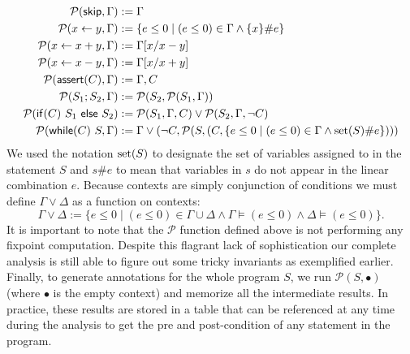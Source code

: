 \documentclass[nocopyrightspace,preprint]{sigplanconf}
\begin{document}
\begin{align*}
\mathcal P(\mathsf{skip}, \Gamma) &:= \Gamma \\
\mathcal P(x \gets y, \Gamma) &:= \{ e \le 0 \mid (e \le 0) \in \Gamma \land \{x\} \# e \} \\
\mathcal P(x \gets x + y, \Gamma) &:= \Gamma[x / x - y] \\
\mathcal P(x \gets x - y, \Gamma) &:= \Gamma[x / x + y] \\
\mathcal P(\mathsf{assert}(C), \Gamma) &:= \Gamma,C \\
\mathcal P(S_1; S_2, \Gamma) &:= \mathcal P(S_2, \mathcal P(S_1, \Gamma)) \\
\mathcal P(\mathsf{if} (C)~S_1~\mathsf{else}~S_2) &:=
  \mathcal P(S_1, \Gamma,C) \lor \mathcal P(S_2, \Gamma,\neg C) \\
\mathcal P(\mathsf{while}(C)~S, \Gamma) &:=
  \Gamma \lor (\neg C, \mathcal P(S, (C, \{ e \le 0 \mid (e \le 0) \in \Gamma \land {\rm set}(S) \# e \})))
\end{align*}
We used the notation ${\rm set}(S)$ to designate the set of variables
assigned to in the statement $S$ and $s\#e$ to mean that variables
in $s$ do not appear in the linear combination $e$.  Because contexts
are simply conjunction of conditions we must define $\Gamma \lor \Delta$
as a function on contexts:
$$
\Gamma \lor \Delta := \{ e \le 0 \mid (e \le 0) \in \Gamma \cup \Delta \land \Gamma \models (e \le 0) \land \Delta \models (e \le 0) \}.
$$
It is important to note that the $\mathcal P$ function defined above
is not performing any fixpoint computation.  Despite this flagrant
lack of sophistication our complete analysis is still able to figure out some
tricky invariants as exemplified earlier.
Finally, to generate annotations for the whole program $S$,
we run $\mathcal P(S,\bullet)$ (where $\bullet$ is the empty context)
and memorize all the intermediate results.  In practice, these results are stored in
a table that can be referenced at any time during the analysis to get the
pre and post-condition of any statement in the program.
\end{document}
